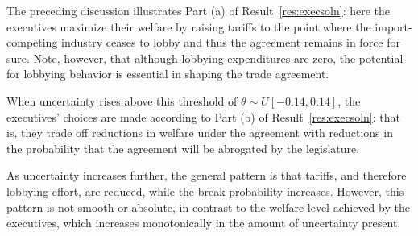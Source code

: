 \documentclass[10pt]{article}
\newcommand{\ve}{\theta}
\begin{document}
The preceding discussion illustrates Part (a) of Result~\ref{res:execsoln}: here the executives maximize their welfare by raising tariffs to the point where the import-competing industry ceases to lobby and thus the agreement remains in force for sure. Note, however, that although lobbying expenditures are zero, the potential for lobbying behavior is essential in shaping the trade agreement.


When uncertainty rises above this threshold of $\ve \sim U[-0.14,0.14]$, the executives' choices are made according to Part (b) of Result~\ref{res:execsoln}: that is, they trade off reductions in welfare under the agreement with reductions in the probability that the agreement will be abrogated by the legislature. %

As uncertainty increases further, the general pattern is that tariffs, and therefore lobbying effort, are reduced, while the break probability increases. However, this pattern is not smooth or absolute, in contrast to the welfare level achieved by the executives, which increases monotonically in the amount of uncertainty present. %
\end{document}
